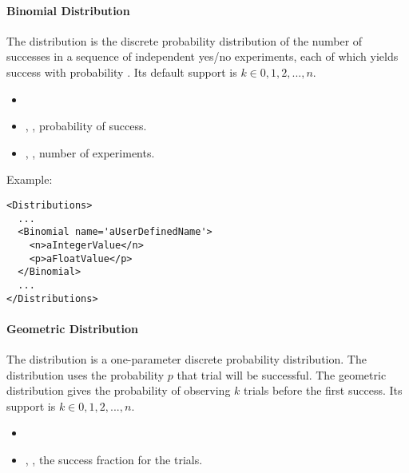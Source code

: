\paragraph{Binomial Distribution}
\label{Binomial}
The  distribution is the discrete probability distribution of
the number of successes in a sequence of  independent yes/no
experiments, each of which yields success with probability .
%
Its default support is $k \in {0, 1, 2, ..., n}$.

%
\attrIntro
\vspace{-5mm}
\begin{itemize}
  \itemsep0em
  \item \nameDescription
\end{itemize}
\vspace{-5mm}
\subnodesIntro
\begin{itemize}
  \item {}, , probability of
  success.
  \item {}, , number of
  experiments.
\end{itemize}

Example:
\begin{lstlisting}[style=XML]
<Distributions>
  ...
  <Binomial name='aUserDefinedName'>
    <n>aIntegerValue</n>
    <p>aFloatValue</p>
  </Binomial>
  ...
</Distributions>
\end{lstlisting}

\paragraph{Geometric Distribution}
\label{Geometric}
The  distribution is a one-parameter discrete probability distribution.
%
The distribution uses the probability $p$ that trial will be
successful.  The geometric distribution gives the probability of
observing $k$ trials before the first success.
%
Its support is $k \in {0, 1, 2, ..., n}$.


\attrIntro
\vspace{-5mm}
\begin{itemize}
  \itemsep0em
\item \nameDescription
\end{itemize}
\vspace{-5mm}
\subnodesIntro
\begin{itemize}
\item {}, , the success fraction for the trials.
\end{itemize}

